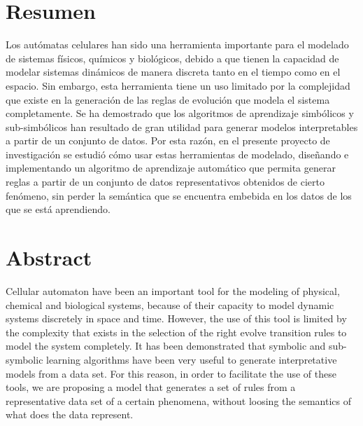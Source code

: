 \pagestyle{plain}
\chapter*{Resumen}
\bigskip
\noindent Los autómatas celulares han sido una herramienta importante para el modelado de sistemas físicos, químicos y biológicos, debido a que tienen la capacidad de modelar sistemas dinámicos de manera discreta tanto en el tiempo como en el espacio. Sin embargo, esta herramienta tiene un uso limitado por la complejidad que existe en la generación de las reglas de evolución que modela el sistema completamente. Se ha demostrado que los algoritmos de aprendizaje simbólicos y sub-simbólicos han resultado de gran utilidad para generar modelos interpretables a partir de un conjunto de datos. Por esta razón, en el presente proyecto de investigación se estudió cómo usar estas herramientas de modelado, diseñando e implementando un algoritmo de aprendizaje automático que permita generar reglas a partir de un conjunto de datos representativos obtenidos de cierto fenómeno, sin perder la semántica que se encuentra embebida en los datos de los que se está aprendiendo.

\chapter*{Abstract}
\bigskip
Cellular automaton have been an important tool for the modeling of physical, chemical and biological systems, because of their capacity to model dynamic systems discretely in space and time. However, the use of this tool is limited by the complexity that exists in the selection of the right evolve transition rules to model the system completely. It has been demonstrated that symbolic and sub-symbolic learning algorithms have been very useful to generate interpretative models from a data set. For this reason, in order to facilitate the use of these tools, we are proposing a model that generates a set of rules from a representative data set of a certain phenomena, without loosing the semantics of what does the data represent.
